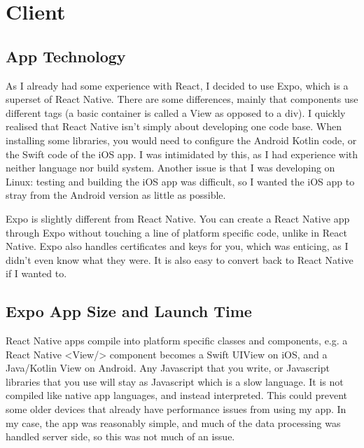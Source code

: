 \documentclass{l4proj}
\begin{document}
\section{Client}
\subsection{App Technology}
As I already had some experience with React, I decided to use Expo, which is a superset of React Native. There are some differences, mainly that components use different tags (a basic container is called a View as opposed to a div). I quickly realised that React Native isn't simply about developing one code base. When installing some libraries, you would need to configure the Android Kotlin code, or the Swift code of the iOS app. I was intimidated by this, as I had experience with neither language nor build system. Another issue is that I was developing on Linux: testing and building the iOS app was difficult, so I wanted the iOS app to stray from the Android version as little as possible.

Expo is slightly different from React Native. You can create a React Native app through Expo without touching a line of platform specific code, unlike in React Native. Expo also handles certificates and keys for you, which was enticing, as I didn't even know what they were. It is also easy to convert back to React Native if I wanted to. 

\subsection{Expo App Size and Launch Time}
React Native apps compile into platform specific classes and components, e.g. a React Native <View/> component becomes a Swift UIView on iOS, and a Java/Kotlin View on Android. Any Javascript that you write, or Javascript libraries that you use will stay as Javascript which is a slow language. It is not compiled like native app languages, and instead interpreted. This could prevent some older devices that already have performance issues from using my app. In my case, the app was reasonably simple, and much of the data processing was handled server side, so this was not much of an issue. 
\end{document}
